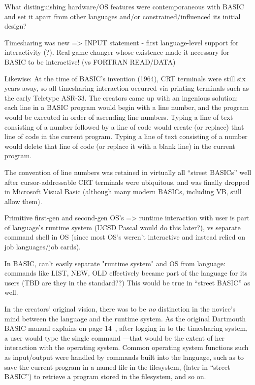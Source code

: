 \documentclass{article}
\begin{document}
What distinguishing hardware/OS features were contemporaneous with BASIC
and set it apart from other languages and/or constrained/influenced its
initial design?

Timesharing was new => INPUT statement - first language-level support for
   interactivity  (?).  Real game changer whose existence made it necessary
for BASIC to be interactive!  (vs FORTRAN READ/DATA)


Likewise: At the time of BASIC's invention (1964), CRT terminals were still six
years away, so all timesharing interaction occurred via printing
terminals such as the early Teletype ASR-33.
The creators came up with an ingenious solution: each line in a BASIC
program would begin with a line number, and the program would be
executed in order of ascending line numbers.
Typing a line of text consisting of a number followed by a line of code
would create (or replace) that line of code in the current program.
Typing a line of text consisting of a number would delete that line of
code (or replace it with a blank line) in the current program.
  \begin{geeknote}
  The convention of line numbers was retained in virtually all ``street
  BASICs'' well after cursor-addressable CRT terminals were ubiquitous,
  and was finally dropped in Microsoft Visual Basic (although many modern
  BASICs, including VB, still allow them).
  \end{geeknote}


Primitive first-gen and second-gen OS's => runtime interaction with user
is part of language's runtime system (UCSD Pascal would do this later?),
vs separate command shell in OS (since most OS's weren't interactive and
instead relied on job languages/job cards).

In BASIC, can't easily separate "runtime system" and OS from language: commands
like LIST, NEW, OLD effectively became part of the language for its
users (TBD are they in the standard??)  This would be true in ``street
BASIC'' as well.

In the
creators' original vision, there was to be \emph{no} distinction in the
novice's mind between the language and the runtime system.  As the
original Dartmouth BASIC manual explains on page
14~\cite{dartmouth_basic_manual}, after logging in to the timesharing
system, a user would type the single command ---that would be the
extent of her interaction with the operating system.  Common operating
system functions such as input/output were handled by commands built
into the language, such as  to save the current program in a
named file in the filesystem,  (later  in ``street
BASIC'') to retrieve a program stored in the filesystem, and so on.
\end{document}
